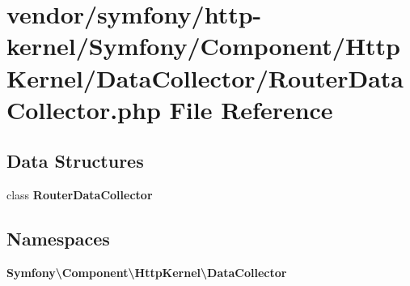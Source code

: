\section{vendor/symfony/http-\/kernel/\+Symfony/\+Component/\+Http\+Kernel/\+Data\+Collector/\+Router\+Data\+Collector.php File Reference}
\label{_router_data_collector_8php}
\subsection*{Data Structures}
\begin{DoxyCompactItemize}
\item 
class {\bf Router\+Data\+Collector}
\end{DoxyCompactItemize}
\subsection*{Namespaces}
\begin{DoxyCompactItemize}
\item 
 {\bf Symfony\textbackslash{}\+Component\textbackslash{}\+Http\+Kernel\textbackslash{}\+Data\+Collector}
\end{DoxyCompactItemize}

